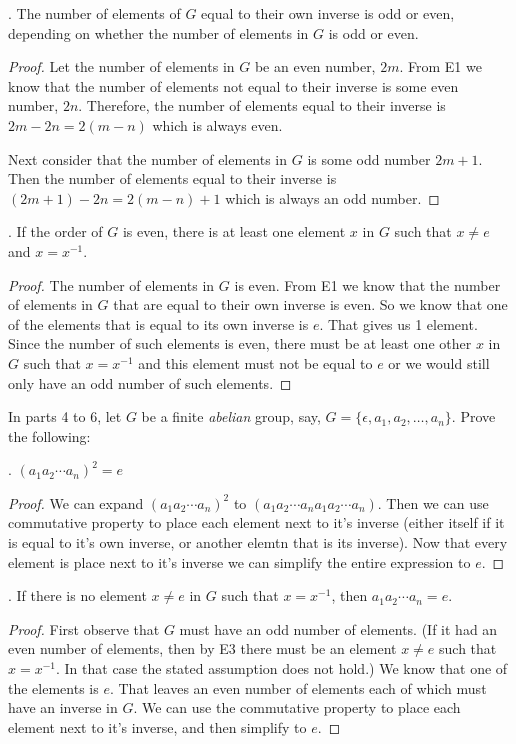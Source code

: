 \documentclass[twoside]{amsart}
\begin{document}
\begin{enumerate}[A.]
   . The number of elements of $G$ equal to their own inverse is
   odd or even, depending on whether the number of elements in $G$ is odd
   or even.
   \begin{proof}
   Let the number of elements in $G$ be an even number, $2m$. From E1 we know
   that the number of elements not equal to their inverse is some even number, 
   $2n$. Therefore, the number of elements equal to their inverse is 
   $2m - 2n = 2(m-n)$ which is always even.

   Next consider that the number of elements in $G$ is some odd number
   $2m + 1$. Then the number of elements equal to their inverse is
   $(2m + 1) - 2n = 2(m-n) + 1$ which is always an odd number.
   \end{proof}

   . If the order of $G$ is even, there is at least one element
   $x$ in $G$ such that $x \ne e$ and $x = x^{-1}$.

   \begin{proof}
   The number of elements in $G$ is even. From E1 we know that the number of
   elements in $G$ that are equal to their own inverse is even. So we know
   that one of the elements that is equal to its own inverse is $e$. That gives
   us 1 element. Since the number of such elements is even, there must be at
   least one other $x$ in $G$ such that $x = x^{-1}$ and this element must not
   be equal to $e$ or we would still only have an odd number of such elements.
   \end{proof}

   \noindent In parts 4 to 6, let $G$ be a finite \emph{abelian} group, 
   say, $G = \{ \epsilon, a_1, a_2, \ldots , a_n\}$. Prove the following:

   . $(a_1a_2\cdots a_n)^2 = e$
   \begin{proof}
      We can expand $(a_1a_2 \cdots a_n)^2$ to $(a_1a_2\cdots a_na_1a_2 \cdots
      a_n)$. Then we can use commutative property to place each element next to
      it's inverse (either itself if it is equal to it's own inverse, or
      another elemtn that is its inverse). Now that every element is place next
      to it's inverse we can simplify the entire expression to $e$.
   \end{proof}

   . If there is no element $x \ne e$ in $G$ such that
   $x=x^{-1}$, then $a_1a_2 \cdots a_n = e$.
   \begin{proof}
   First observe that $G$ must have an odd number of elements. (If it
   had an even number of elements, then by E3 there must be an element
   $x \ne e$ such that $x=x^{-1}$. In that case the stated assumption
   does not hold.) We know that one of the elements is $e$. That leaves
   an even number of elements each of which must have an inverse in $G$.
   We can use the commutative property to place each element next to
   it's inverse, and then simplify to $e$.
   \end{proof}


\end{enumerate}
\end{document}

